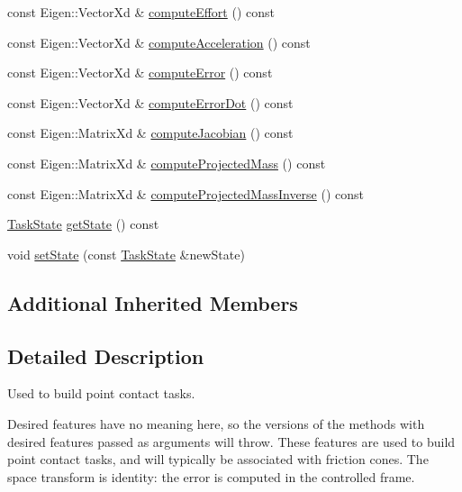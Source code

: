 \begin{DoxyCompactItemize}
const Eigen\+::\+Vector\+Xd \& \hyperlink{classocra_1_1PointContactFeature_ad925987e17dcfa0f8157deff33b9d311}{compute\+Effort} () const
\item 
const Eigen\+::\+Vector\+Xd \& \hyperlink{classocra_1_1PointContactFeature_a4266a665917b98bb507c4047c9bf6c0c}{compute\+Acceleration} () const
\item 
const Eigen\+::\+Vector\+Xd \& \hyperlink{classocra_1_1PointContactFeature_ab8504be30483fdcbeb25f9003a34471b}{compute\+Error} () const
\item 
const Eigen\+::\+Vector\+Xd \& \hyperlink{classocra_1_1PointContactFeature_a536bd532919a1a7f37a97aed625112b1}{compute\+Error\+Dot} () const
\item 
const Eigen\+::\+Matrix\+Xd \& \hyperlink{classocra_1_1PointContactFeature_a969bbe345edbcf6abecdd863630faa3f}{compute\+Jacobian} () const
\item 
const Eigen\+::\+Matrix\+Xd \& \hyperlink{classocra_1_1PointContactFeature_a04933fcbcc63eee1d7dbf926a0cbca8a}{compute\+Projected\+Mass} () const
\item 
const Eigen\+::\+Matrix\+Xd \& \hyperlink{classocra_1_1PointContactFeature_abb683382f022909cc02396e50be9328f}{compute\+Projected\+Mass\+Inverse} () const
\item 
\hyperlink{classocra_1_1TaskState}{Task\+State} \hyperlink{classocra_1_1PointContactFeature_a314df3ffae28a0be71d75317e1f56ab8}{get\+State} () const
\item 
void \hyperlink{classocra_1_1PointContactFeature_ae51b5ff581c698fd63048fbbd964c567}{set\+State} (const \hyperlink{classocra_1_1TaskState}{Task\+State} \&new\+State)
\end{DoxyCompactItemize}
\subsection*{Additional Inherited Members}


\subsection{Detailed Description}
Used to build point contact tasks. 

Desired features have no meaning here, so the versions of the methods with desired features passed as arguments will throw. These features are used to build point contact tasks, and will typically be associated with friction cones. The space transform is identity\+: the error is computed in the controlled frame. 

